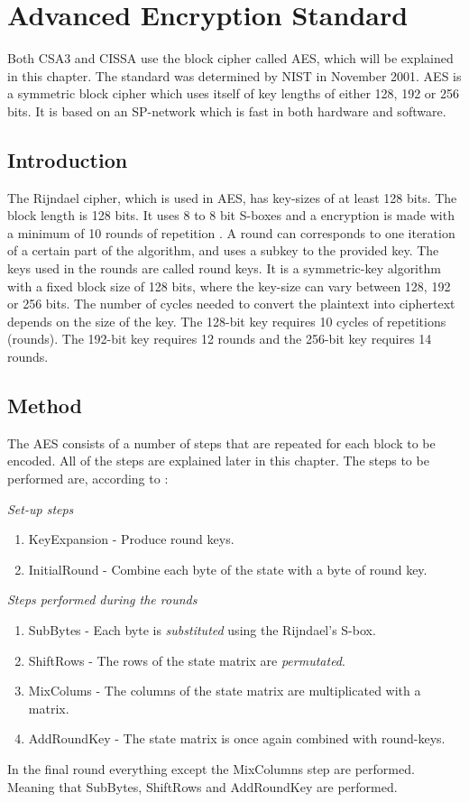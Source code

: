 \chapter{Advanced Encryption Standard}\label{ch:AES}
Both CSA3 and CISSA use the block cipher called AES, which will be 
explained in this chapter. The standard was determined by NIST in 
November 2001. AES is a symmetric block cipher which uses itself of
key lengths of either 128, 192 or 256 bits. It is based on an 
SP-network which is fast in both hardware and software. 

\section{Introduction}
The Rijndael cipher, which is used in AES, has key-sizes of at least 
128 bits. The block length is 128 bits. It uses 8 to 8 bit S-boxes 
and a encryption is made with a minimum of 10 rounds of repetition 
\citep[p. 79]{Stinson:2006}. A round can corresponds to one iteration 
of a certain part of the algorithm, and uses a subkey to the provided 
key. The keys used in the rounds are called round keys. It is a 
symmetric-key algorithm with a fixed block size of 128 bits, where the 
key-size can vary between 128, 192 or 256 bits. The number of cycles 
needed to convert the plaintext into ciphertext depends on the size of 
the key. The 128-bit key requires 10 cycles of repetitions (rounds). 
The 192-bit key requires 12 rounds and the 256-bit key requires 14 
rounds. \citep[p. 103]{Stinson:2006}

\section{Method}
The AES consists of a number of steps that are repeated for each block 
to be encoded. All of the steps are explained later in this chapter.
The steps to be performed are, according to \citet{Stinson:2006}:

\newpage
\emph{Set-up steps}
\begin{enumerate}
\item KeyExpansion - Produce round keys.
\item InitialRound - Combine each byte of the state with a byte of 
  round key.
\end{enumerate}
\emph{Steps performed during the rounds}
\begin{enumerate}
\item SubBytes - Each byte is \emph{substituted} using the Rijndael's 
  S-box.
\item ShiftRows - The rows of the state matrix are \emph{permutated}.
\item MixColums - The columns of the state matrix are multiplicated with a 
  matrix.
\item AddRoundKey - The state matrix is once again combined with 
  round-keys.
\end{enumerate}
In the final round everything except the MixColumns step are 
performed. Meaning that SubBytes, ShiftRows and AddRoundKey are 
performed.


